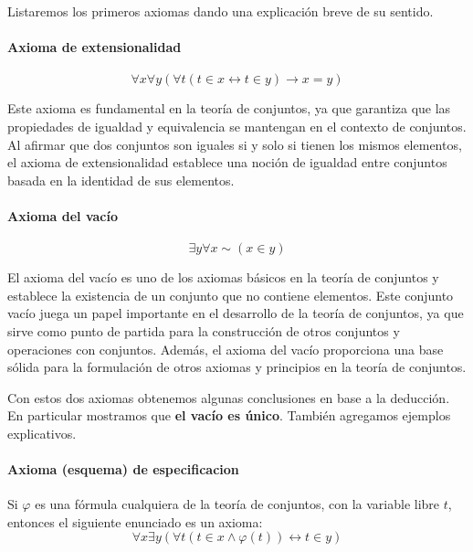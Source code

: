 Listaremos  los  primeros  axiomas  dando  una  explicación  breve  de  su  sentido. 

\paragraph*{Axioma de extensionalidad}\vspace{-1em}
\begin{equation*}
	\forall x\forall y(\forall t(t\in x\leftrightarrow t\in y)\rightarrow x=y)
\end{equation*}

Este axioma es fundamental en la teoría de conjuntos, ya que garantiza que las propiedades de igualdad y equivalencia se mantengan en el contexto de conjuntos. Al afirmar que dos conjuntos son iguales si y solo si tienen los mismos elementos, el axioma de extensionalidad establece una noción de igualdad entre conjuntos basada en la identidad de sus elementos. 

\paragraph*{Axioma del vacío}\vspace{-1em}
\begin{equation*}
	\exists y\forall x\sim\left(x\in y\right)
\end{equation*}

El axioma del vacío es uno de los axiomas básicos en la teoría de conjuntos y establece la existencia de un conjunto que no contiene elementos. Este conjunto vacío juega un papel importante en el desarrollo de la teoría de conjuntos, ya que sirve como punto de partida para la construcción de otros conjuntos y operaciones con conjuntos. Además, el axioma del vacío proporciona una base sólida para la formulación de otros axiomas y principios en la teoría de conjuntos.

Con estos dos axiomas obtenemos algunas conclusiones en base a la deducción. En particular mostramos que \textbf{el vacío es único}. También agregamos ejemplos explicativos.

\paragraph*{Axioma (esquema) de especificacion}

Si $\varphi$ es una fórmula cualquiera de la teoría de conjuntos, con la variable libre $t$, entonces el siguiente enunciado es un axioma:
\begin{equation*}
	\forall x\exists y\left(\forall t\left(t\in x\land\varphi\left(t\right)\right)\leftrightarrow t\in y\right)
\end{equation*}

